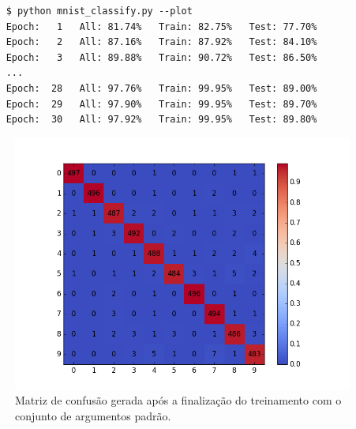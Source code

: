 \documentclass{../../sftex/sftex}
\begin{document}
\begin{verbatim}
    $ python mnist_classify.py --plot
    Epoch:   1   All: 81.74%   Train: 82.75%   Test: 77.70%
    Epoch:   2   All: 87.16%   Train: 87.92%   Test: 84.10%
    Epoch:   3   All: 89.88%   Train: 90.72%   Test: 86.50%
    ...
    Epoch:  28   All: 97.76%   Train: 99.95%   Test: 89.00%
    Epoch:  29   All: 97.90%   Train: 99.95%   Test: 89.70%
    Epoch:  30   All: 97.92%   Train: 99.95%   Test: 89.80%
\end{verbatim}

\begin{figure}[htbp]
    \centering
    \includegraphics[scale=0.65]{confusion_matrix}
    \caption{Matriz de confusão gerada após a finalização do treinamento
        com o conjunto de argumentos padrão.}
\end{figure}
\end{document}
